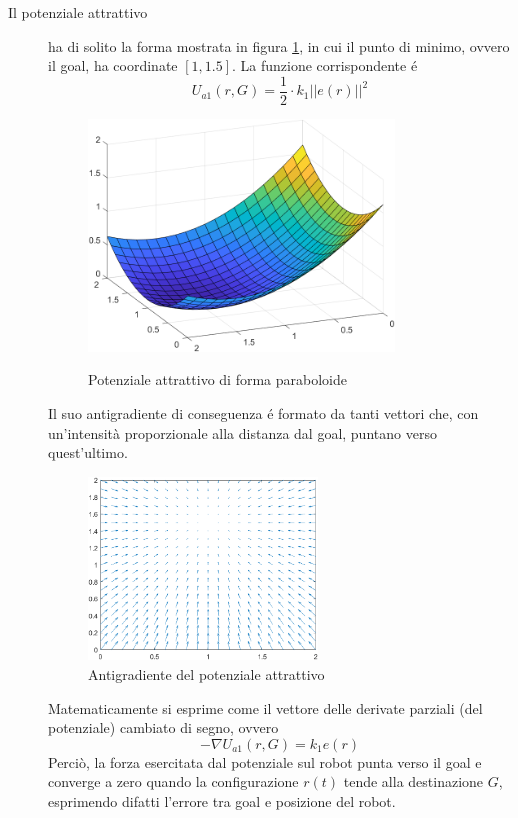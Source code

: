 \documentclass[14pt,a4paper]{extarticle}
\begin{document}
\begin{description}
\item[Il potenziale attrattivo] ha di solito la forma mostrata in figura \ref{potA}, in cui il punto di minimo, ovvero il goal, ha coordinate \([1,1.5]\). La funzione corrispondente é
\[
U_{a1}(r,G) = \frac{1}{2} \cdot k_1 ||e(r)||^2
\]
\begin{figure}[H]
\centering
\caption{Potenziale attrattivo di forma paraboloide}
\includegraphics[width=0.8\textwidth]{potA.png}
\label{potA}
\end{figure}
Il suo antigradiente di conseguenza é formato da tanti vettori che, con un'intensità proporzionale alla distanza dal goal, puntano verso quest'ultimo.
\begin{figure}[H]
\centering
\caption{Antigradiente del potenziale attrattivo}
\label{antigradA}
\includegraphics[width=0.6\textwidth]{antigradA.png}
\end{figure} 
Matematicamente si esprime come il vettore delle derivate parziali (del potenziale) cambiato di segno, ovvero 
\begin{equation}
-\nabla U_{a1}(r,G) = k_1 e(r)
\end{equation}
Perciò, la forza esercitata dal potenziale sul robot punta verso il goal e converge a zero quando la configurazione \(r(t)\) tende alla destinazione \(G\), esprimendo difatti l'errore tra goal e posizione del robot.\\


\end{description}
\end{document}
